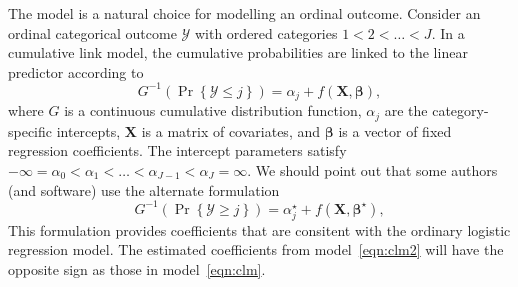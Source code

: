 The  model is a natural choice for modelling an ordinal outcome. Consider an ordinal categorical outcome $\mathcal{Y}$ with ordered categories $1 < 2 < \dots < J$. In a cumulative link model, the cumulative probabilities are linked to the linear predictor according to
\begin{equation}
\label{eqn:clm}
  G^{-1}\left(\Pr\left\{\mathcal{Y} \le j\right\}\right) = \alpha_j + f\left(\boldsymbol{X}, \boldsymbol{\beta}\right),
\end{equation}
where $G$ is a continuous cumulative distribution function, $\alpha_j$ are the category-specific intercepts, $\boldsymbol{X}$ is a matrix of covariates, and $\boldsymbol{\beta}$ is a vector of fixed regression coefficients. The intercept parameters satisfy $-\infty = \alpha_0 < \alpha_1 < \dots < \alpha_{J-1} < \alpha_J = \infty$. We should point out that some authors (and software) use the alternate formulation
\begin{equation}
\label{eqn:clm2}
  G^{-1}\left(\Pr\left\{\mathcal{Y} \ge j\right\}\right) = \alpha_j^\star + f\left(\boldsymbol{X}, \boldsymbol{\beta}^\star\right),
\end{equation}
This formulation provides coefficients that are consitent with the ordinary logistic regression model. The estimated coefficients from model~\eqref{eqn:clm2} will have the opposite sign as those in model~\eqref{eqn:clm}.

